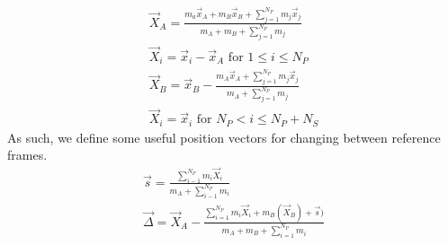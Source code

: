 \documentclass{aastex631}
\begin{document}
\begin{equation}
    \begin{split}
        \vec{X}_A = \frac{m_a\vec{x}_A+m_B\vec{x}_B+\sum_{j=1}^{N_P}m_j\vec{x}_j}{m_A+m_B+\sum_{j=1}^{N_P}m_j} \\
        \vec{X}_i = \vec{x}_i-\vec{x}_A \text{   for   } 1\leq i \leq N_P \\ 
        \vec{X}_B = \vec{x}_B-\frac{m_A\vec{x}_A+\sum_{j=1}^{N_P}m_j\vec{x}_j}{m_A+\sum_{j=1}^{N_P}m_j} \\
        \vec{X}_i = \vec{x}_i \text{   for   } N_P < i \leq N_P+N_S
     \end{split}
\label{positions}
\end{equation}
As such, we define some useful position vectors for changing between reference frames.
\begin{equation}
\begin{split}
    \vec{s} = \frac{\sum_{i-1}^{N_P}m_i\vec{X}_i}{m_A+\sum_{i-1}^{N_P}m_i}\\
    \vec{\Delta} = \vec{X}_A-\frac{\sum_{i=1}^{N_P}m_i\vec{X}_i+m_B(\vec{X}_B)+\vec{s})}{m_A+m_B+\sum_{i=1}^{N_P}m_i}
\end{split}
\end{equation}
\end{document}
